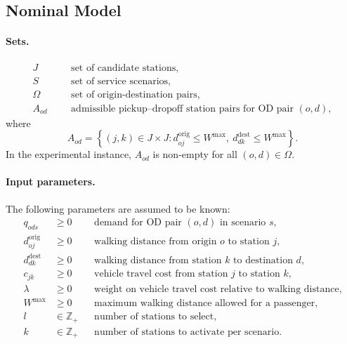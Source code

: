 \documentclass[11pt]{article}
\theoremstyle{definition}
\begin{document}
\subsection{Nominal Model}

\paragraph{Sets.}
\[
	\begin{aligned}
		J      &  &  & \text{set of candidate stations,}                                  \\
		S      &  &  & \text{set of service scenarios,}                                   \\
		\Omega &  &  & \text{set of origin-destination pairs,}                            \\
		A_{od} &  &  & \text{admissible pickup--dropoff station pairs for OD pair }(o,d),
	\end{aligned}
\]
where
\[
	A_{od}
	=
	\left\{
	(j,k)\in J\times J :
	d^{\mathrm{orig}}_{oj}\le W^{\max},\
	d^{\mathrm{dest}}_{dk}\le W^{\max}
	\right\}.
\]
In the experimental instance, $A_{od}$ is non-empty for all $(o,d)\in\Omega$.

\paragraph{Input parameters.}
The following parameters are assumed to be known:
\[
	\begin{aligned}
		q_{ods}                & \ge 0              &  & \text{demand for OD pair }(o,d)\text{ in scenario }s,              \\
		d^{\mathrm{orig}}_{oj} & \ge 0              &  & \text{walking distance from origin }o\text{ to station }j,         \\
		d^{\mathrm{dest}}_{dk} & \ge 0              &  & \text{walking distance from station }k\text{ to destination }d,    \\
		c_{jk}                 & \ge 0              &  & \text{vehicle travel cost from station }j\text{ to station }k,     \\
		\lambda                & \ge 0              &  & \text{weight on vehicle travel cost relative to walking distance,} \\
		W^{\max}               & \ge 0              &  & \text{maximum walking distance allowed for a passenger,}           \\
		l                      & \in \mathbb{Z}_{+} &  & \text{number of stations to select,}                               \\
		k                      & \in \mathbb{Z}_{+} &  & \text{number of stations to activate per scenario.}
	\end{aligned}
\]
\end{document}
